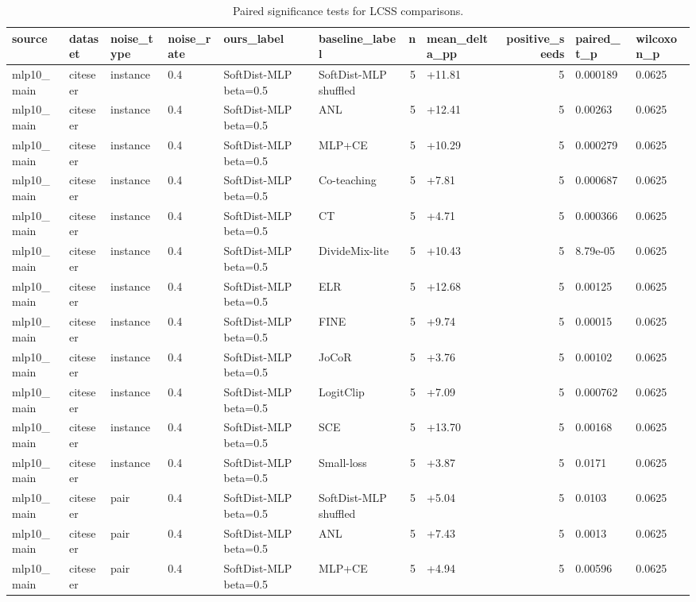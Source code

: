 \begin{table}[t]
\centering
\caption{Paired significance tests for LCSS comparisons.}
\label{tab:paired-significance}
\begin{tabular}{llllllrlrll}
\toprule
source & dataset & noise_type & noise_rate & ours_label & baseline_label & n & mean_delta_pp & positive_seeds & paired_t_p & wilcoxon_p \\
\midrule
mlp10_main & citeseer & instance & 0.4 & SoftDist-MLP beta=0.5 & SoftDist-MLP shuffled & 5 & +11.81 & 5 & 0.000189 & 0.0625 \\
mlp10_main & citeseer & instance & 0.4 & SoftDist-MLP beta=0.5 & ANL & 5 & +12.41 & 5 & 0.00263 & 0.0625 \\
mlp10_main & citeseer & instance & 0.4 & SoftDist-MLP beta=0.5 & MLP+CE & 5 & +10.29 & 5 & 0.000279 & 0.0625 \\
mlp10_main & citeseer & instance & 0.4 & SoftDist-MLP beta=0.5 & Co-teaching & 5 & +7.81 & 5 & 0.000687 & 0.0625 \\
mlp10_main & citeseer & instance & 0.4 & SoftDist-MLP beta=0.5 & CT & 5 & +4.71 & 5 & 0.000366 & 0.0625 \\
mlp10_main & citeseer & instance & 0.4 & SoftDist-MLP beta=0.5 & DivideMix-lite & 5 & +10.43 & 5 & 8.79e-05 & 0.0625 \\
mlp10_main & citeseer & instance & 0.4 & SoftDist-MLP beta=0.5 & ELR & 5 & +12.68 & 5 & 0.00125 & 0.0625 \\
mlp10_main & citeseer & instance & 0.4 & SoftDist-MLP beta=0.5 & FINE & 5 & +9.74 & 5 & 0.00015 & 0.0625 \\
mlp10_main & citeseer & instance & 0.4 & SoftDist-MLP beta=0.5 & JoCoR & 5 & +3.76 & 5 & 0.00102 & 0.0625 \\
mlp10_main & citeseer & instance & 0.4 & SoftDist-MLP beta=0.5 & LogitClip & 5 & +7.09 & 5 & 0.000762 & 0.0625 \\
mlp10_main & citeseer & instance & 0.4 & SoftDist-MLP beta=0.5 & SCE & 5 & +13.70 & 5 & 0.00168 & 0.0625 \\
mlp10_main & citeseer & instance & 0.4 & SoftDist-MLP beta=0.5 & Small-loss & 5 & +3.87 & 5 & 0.0171 & 0.0625 \\
mlp10_main & citeseer & pair & 0.4 & SoftDist-MLP beta=0.5 & SoftDist-MLP shuffled & 5 & +5.04 & 5 & 0.0103 & 0.0625 \\
mlp10_main & citeseer & pair & 0.4 & SoftDist-MLP beta=0.5 & ANL & 5 & +7.43 & 5 & 0.0013 & 0.0625 \\
mlp10_main & citeseer & pair & 0.4 & SoftDist-MLP beta=0.5 & MLP+CE & 5 & +4.94 & 5 & 0.00596 & 0.0625 \\

\end{tabular}
\end{table}
